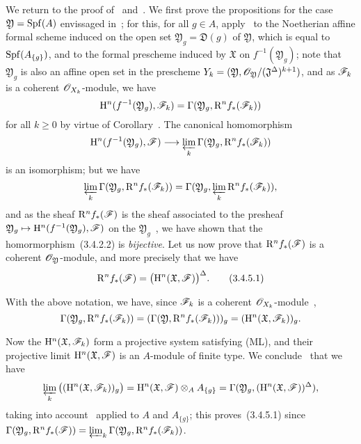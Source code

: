 \begin{env}[3.4.5]
\label{3.3.4.5}
We return to the proof of~ and~.
We first prove the propositions for the case $\mathfrak{Y}=\operatorname{Spf}(A)$ envissaged in~; for this, for all $g\in A$, apply~ to the Noetherian affine formal scheme induced on the open set $\mathfrak{Y}_g=\mathfrak{D}(g)$ of $\mathfrak{Y}$, which is equal to $\operatorname{Spf}(A_{\{g\}})$, and to the formal prescheme induced by $\mathfrak{X}$ on $f^{-1}(\mathfrak{Y}_g)$; note that $\mathfrak{Y}_g$ is also an affine open set in the prescheme $Y_k=(\mathfrak{Y},\mathscr{O}_\mathfrak{Y}/(\mathfrak{J}^\Delta)^{k+1})$, and as $\mathscr{F}_k$ is a coherent $\mathscr{O}_{X_k}$-module, we have
\[
  \mathrm{H}^n(f^{-1}(\mathfrak{Y}_g),\mathscr{F}_k)=\Gamma(\mathfrak{Y}_g,\mathrm{R}^n f_*(\mathscr{F}_k))
\]
for all $k\geq 0$ by virtue of Corollary~.
The canonical homomorphism
\[
  \HH^n(f^{-1}(\mathfrak{Y}_g),\sh{F})\to\varprojlim_k\Gamma(\mathfrak{Y}_g,\RR^n f_*(\sh{F}_k))
\]
is an isomorphism; but we have~
\[
  \varprojlim_k\Gamma(\mathfrak{Y}_g,\mathrm{R}^n f_*(\mathscr{F}_k))=\Gamma(\mathfrak{Y}_g,\varprojlim_k\mathrm{R}^n f_*(\mathscr{F}_k)),
\]
and as the sheaf $\mathrm{R}^n f_*(\mathscr{F})$ is the sheaf associated to the presheaf $\mathfrak{Y}_g\mapsto\HH^n(f^{-1}(\mathfrak{Y}_g),\sh{F})$ on the $\mathfrak{Y}_g$~, we have shown that the homormorphism~(3.4.2.2) is \emph{bijective}.
Let us now prove that $\mathrm{R}^n f_*(\mathscr{F})$ is a coherent $\mathscr{O}_\mathfrak{Y}$-module, and more precisely that we have
\[
\label{3.3.4.5.1}
  \mathrm{R}^n f_*(\mathscr{F})=\big(\mathrm{H}^n(\mathfrak{X},\mathscr{F})\big)^\Delta.
  \tag{3.4.5.1}
\]

With the above notation, we have, since $\mathscr{F}_k$ is a coherent $\mathscr{O}_{X_k}$-module~,
\[
  \Gamma(\mathfrak{Y}_g,\mathrm{R}^n f_*(\mathscr{F}_k))=(\Gamma(\mathfrak{Y},\mathrm{R}^n f_*(\mathscr{F}_k)))_g=(\mathrm{H}^n(\mathfrak{X},\mathscr{F}_k))_g.
\]

Now the $\mathrm{H}^n(\mathfrak{X},\mathscr{F}_k)$ form a projective system satisfying (ML), and their projective limit $\mathrm{H}^n(\mathfrak{X},\mathscr{F})$ is an $A$-module of finite type.
We conclude~ that we have
\[
  \varprojlim_k\big((\mathrm{H}^n(\mathfrak{X},\mathscr{F}_k))_g\big)=\mathrm{H}^n(\mathfrak{X},\mathscr{F})\otimes_A A_{\{g\}}=\Gamma(\mathfrak{Y}_g,(\mathrm{H}^n(\mathfrak{X},\mathscr{F}))^\Delta),
\]
taking into account~ applied to $A$ and $A_{\{g\}}$; this proves~(3.4.5.1) since $\Gamma(\mathfrak{Y}_g,\mathrm{R}^n f_*(\mathscr{F}))=\varprojlim_k\Gamma(\mathfrak{Y}_g,\mathrm{R}^n f_*(\mathscr{F}_k))$.


\end{env}
